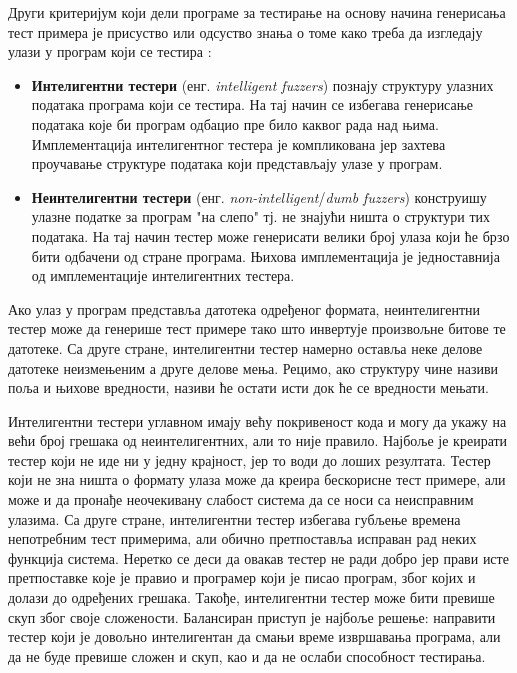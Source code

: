 \documentclass[12pt,oneside]{memoir}
\begin{document}
Други критеријум који дели програме за тестирање на основу начина генерисања тест примера је присуство или одсуство знања о томе како треба да изгледају улази у програм који се тестира \cite{fuzzingBrute, fuzzing}:
\begin{itemize}
\item \textbf{Интелигентни тестери} (енг. \textit{intelligent fuzzers}) познају структуру улазних података програма који се тестира. На тај начин се избегава генерисање података које би програм одбацио пре било каквог рада над њима. Имплементација интелигентног тестера је компликована јер захтева проучавање структуре података који представљају улазе у програм.
\item \textbf{Неинтелигентни тестери} (енг. \textit{non-intelligent}/\textit{dumb fuzzers}) конструишу улазне податке за програм "на слепо" тј. не знајући ништа о структури тих података. На тај начин тестер може генерисати велики број улаза који ће брзо бити одбачени од стране програма.
Њихова имплементација је једноставнија од имплементације интелигентних тестера.
\end{itemize}

Ако улаз у програм представља датотека одређеног формата, неинтелигентни тестер може да генерише тест примере тако што инвертује произвољне битове те датотеке. Са друге стране, интелигентни тестер намерно оставља неке делове датотеке неизмењеним а друге делове мења. Рецимо, ако структуру чине називи поља и њихове вредности, називи ће остати исти док ће се вредности мењати.

Интелигентни тестери углавном имају већу покривеност кода и могу да укажу на већи број грешака од неинтелигентних, али то није правило. Најбоље је креирати тестер који не иде ни у једну крајност, јер то води до лоших резултата. Тестер који не зна ништа о формату улаза може да креира бескорисне тест примере, али може и да пронађе неочекивану слабост система да се носи са неисправним улазима. Са друге стране, интелигентни тестер избегава губљење времена непотребним тест примерима, али обично претпоставља исправан рад неких функција система. Неретко се деси да овакав тестер не ради добро јер прави исте претпоставке које је правио и програмер који је писао програм, због којих и долази до одређених грешака. Такође, интелигентни тестер може бити превише скуп због своје сложености. Балансиран приступ је најбоље решење: направити тестер који је довољно интелигентан да смањи време извршавања програма, али да не буде превише сложен и скуп, као и да не ослаби способност тестирања.
\end{document}
